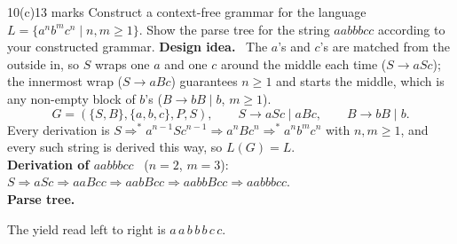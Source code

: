 \documentclass[10.5pt,a4paper]{article}
\newcommand{\ansh}[1]{\textbf{\color{exborder}#1}\ }
\begin{document}
\begin{qa}{10(c)}{13 marks}
Construct a context-free grammar for the language $L=\{a^nb^mc^n\mid n,m\ge1\}$. Show the parse tree for the string $aabbbcc$ according to your
constructed grammar.
\tcblower
\ansh{Design idea.} The $a$'s and $c$'s are matched from the outside in, so $S$ wraps one $a$ and one $c$ around the middle each time
($S\to aSc$); the innermost wrap ($S\to aBc$) guarantees $n\ge1$ and starts the middle, which is any non-empty block of $b$'s ($B\to bB\mid b$,
$m\ge1$).
\[G=(\{S,B\},\{a,b,c\},P,S),\qquad S\to aSc\mid aBc,\qquad B\to bB\mid b.\]
Every derivation is $S\Rightarrow^*a^{n-1}Sc^{n-1}\Rightarrow a^nBc^n\Rightarrow^*a^nb^mc^n$ with $n,m\ge1$, and every such string is derived this way,
so $L(G)=L$.\\
\ansh{Derivation of $aabbbcc$} ($n=2$, $m=3$): $S\Rightarrow aSc\Rightarrow aaBcc\Rightarrow aabBcc\Rightarrow aabbBcc\Rightarrow aabbbcc$.\\
\ansh{Parse tree.}
\begin{center}
\end{center}
The yield read left to right is $a\,a\,b\,b\,b\,c\,c$.
\end{qa}
\end{document}
